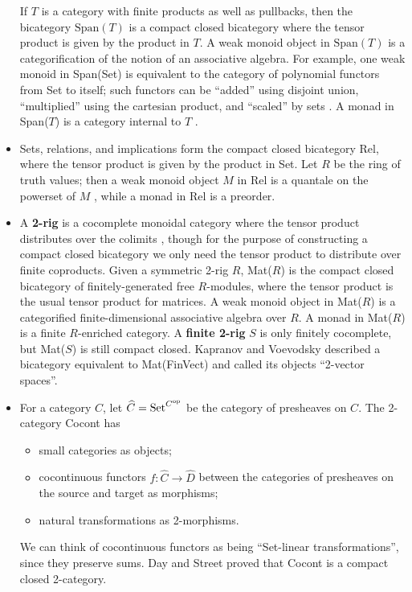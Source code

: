 \documentclass[12pt,twoside,openright]{report}
\newcommand{\Set}{\mathrm{Set}}
\newcommand{\op}{{\rm op}}
\newcommand{\Span}{\mbox{Span}}
\begin{document}
\begin{itemize}
  If $T$ is a category with finite products as well as pullbacks, then the bicategory $\Span(T)$ is a compact closed bicategory where the tensor product is given by the product in $T.$  A weak monoid object in
$\Span(T)$ is a categorification of the notion of an associative algebra.
  For example, one weak monoid in Span(Set) is equivalent to the category of polynomial functors from Set to itself; such functors can be
``added'' using disjoint union, ``multiplied'' using the cartesian product, and ``scaled'' by sets \cite{GK}.  A monad in Span($T$) is a category internal to $T$ \cite{Ben67}.
  \item Sets, relations, and implications form the compact closed bicategory Rel, where the tensor product is given by the product in Set. Let $R$ be the ring of truth values; then a weak monoid object $M$ in Rel is a quantale on the powerset of $M$ \cite{ShulCafe}, while a monad in Rel is a preorder.
  \item A {\bf 2-rig} is a cocomplete monoidal category where the tensor product distributes over the colimits \cite{HDA3}, though for the purpose of constructing a compact closed bicategory we only need the tensor product to distribute over finite coproducts.  Given a symmetric
2-rig $R$, Mat($R$) is the compact closed bicategory of finitely-generated free $R$-modules, where the tensor product is the usual tensor product for matrices.  A weak monoid object in Mat($R$) is a categorified finite-dimensional associative algebra over $R.$  A monad in Mat($R$) is a finite $R$-enriched category.  A {\bf finite 2-rig} $S$
is only finitely cocomplete, but Mat($S$) is still compact closed. Kapranov and Voevodsky \cite{KV94} described a bicategory equivalent to Mat(FinVect) and called its objects ``2-vector spaces''.
  \item For a category $C$, let $\widehat{C} = \Set^{C^{\op}}$ be the category of presheaves on $C$.  The 2-category Cocont has
    \begin{itemize}
      \item small categories as objects;
      \item cocontinuous functors $f:\widehat{C} \to \widehat{D}$
between the categories of presheaves on the source and target as morphisms;
      \item natural transformations as 2-morphisms.
    \end{itemize}
    We can think of cocontinuous functors as being ``Set-linear transformations'', since they preserve sums.  Day and Street \cite{DS97}
proved that Cocont is a compact closed 2-category.

\end{itemize}
\end{document}
